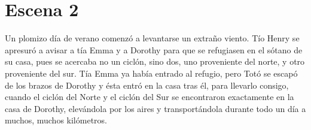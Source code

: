 \chapter{Escena 2}

Un plomizo día de verano comenzó a levantarse un extraño viento. Tío Henry se apresuró a avisar a tía Emma y a Dorothy para que se refugiasen en el sótano de su casa, pues se acercaba no un ciclón, sino dos, uno proveniente del norte, y otro proveniente del sur. 
Tía Emma ya había entrado al refugio, pero Totó se escapó de los brazos de Dorothy y ésta entró en la casa tras él, para llevarlo consigo, cuando el ciclón del Norte y el ciclón del Sur se encontraron exactamente en la casa de Dorothy, elevándola por los aires y transportándola durante todo un día a muchos, muchos kilómetros.